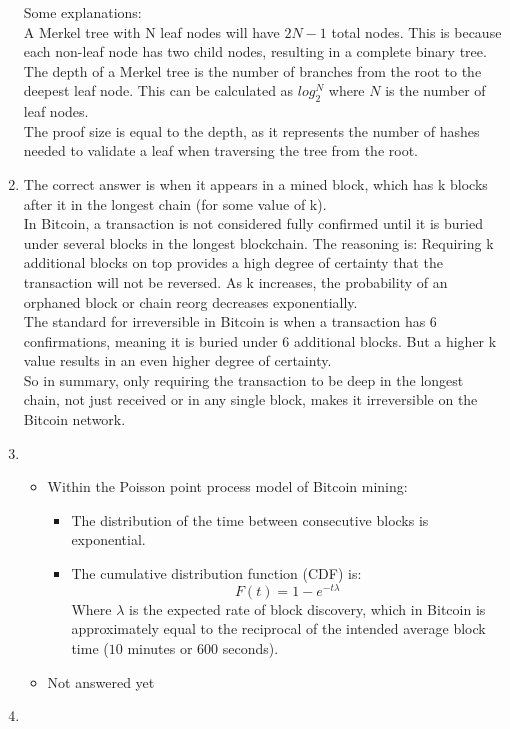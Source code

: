 \documentclass{report}
\begin{document}
\begin{enumerate}
	Some explanations:\\
	A Merkel tree with N leaf nodes will have $2N - 1$ total nodes. This is because each non-leaf node has two child nodes, resulting in a complete binary tree.\\
	The depth of a Merkel tree is the number of branches from the root to the deepest leaf node. This can be calculated as $log_{2}^{N}$ where $N$ is the number of leaf nodes.\\
	The proof size is equal to the depth, as it represents the number of hashes needed to validate a leaf when traversing the tree from the root.
	\item The correct answer is when it appears in a mined block, which has k blocks after it in the longest chain (for some value of k).\\
	In Bitcoin, a transaction is not considered fully confirmed until it is buried under several blocks in the longest blockchain. The reasoning is:
	Requiring k additional blocks on top provides a high degree of certainty that the transaction will not be reversed. As k increases, the probability of an orphaned block or chain reorg decreases exponentially.\\
	The standard for irreversible in Bitcoin is when a transaction has 6 confirmations, meaning it is buried under 6 additional blocks. But a higher k value results in an even higher degree of certainty.\\
	So in summary, only requiring the transaction to be deep in the longest chain, not just received or in any single block, makes it irreversible on the Bitcoin network.
	\item \begin{itemize}
		\item Within the Poisson point process model of Bitcoin mining:\\
		\begin{itemize}
			\item The distribution of the time between consecutive blocks is exponential.
			\item The cumulative distribution function (CDF) is:
			$$F(t) = 1 - e^{-t\lambda}$$
			Where $\lambda$ is the expected rate of block discovery, which in Bitcoin is approximately equal to the reciprocal of the intended average block time ($10$ minutes or $600$ seconds).
		\end{itemize}
		\item Not answered yet \text{:))}
	\end{itemize}
	\item 

\end{enumerate}
\end{document}
